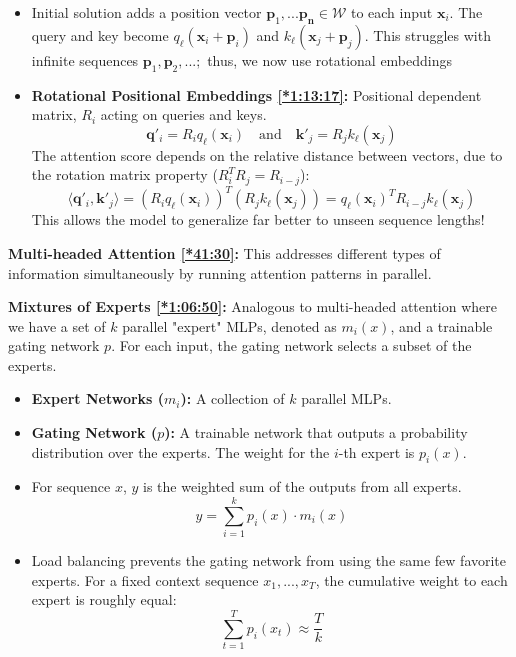 \documentclass[12pt, twoside]{article}
\theoremstyle{spaceddefn}
\begin{document}
\begin{itemize}
    \item Initial solution adds a position vector $\mathbf{p}_1,...\mathbf{p_n} \in \mathcal{W}$ to each input $\mathbf{x}_i$. The query and key become $q_\ell(\mathbf{x}_i + \mathbf{p}_i)$ and $k_\ell(\mathbf{x}_j + \mathbf{p}_j)$. This struggles with infinite sequences $\textbf{p}_1,\textbf{p}_2,...;$ thus, we now use rotational embeddings
    \item \textbf{Rotational Positional Embeddings \href{https://youtu.be/1u6h3Nm3NvM?si=uJFx5andJnolQajy&t=4397}{[*1:13:17]}:} Positional dependent matrix, $R_i$ acting on queries and keys.
\[
\mathbf{q}'_i = R_i q_\ell(\mathbf{x}_i) \quad \text{and} \quad \mathbf{k}'_j = R_j k_\ell(\mathbf{x}_j)
\]
The attention score depends on the relative distance between vectors, due to the rotation matrix property ($R_i^T R_j = R_{i-j}$):
\[
\langle \mathbf{q}'_i, \mathbf{k}'_j \rangle = (R_i q_\ell(\mathbf{x}_i))^T (R_j k_\ell(\mathbf{x}_j)) = q_\ell(\mathbf{x}_i)^T R_{i-j} k_\ell(\mathbf{x}_j)
\]
This allows the model to generalize far better to unseen sequence lengths!

\end{itemize}



\textbf{Multi-headed Attention \href{https://youtu.be/1u6h3Nm3NvM?si=8XEsgSeUe-450EJZ&t=2490}{[*41:30]}:} This addresses different types of information simultaneously by running attention patterns in parallel.

\textbf{Mixtures of Experts \href{https://youtu.be/1u6h3Nm3NvM?si=n3l9F7Tf5RbvhOU4&t=4010}{[*1:06:50]}:} Analogous to multi-headed attention where we have a set of $k$ parallel "expert" MLPs, denoted as $m_i(x)$, and a trainable gating network $p$. For each input, the gating network selects a subset of the experts.

\begin{itemize}
    \item \textbf{Expert Networks ($m_i$):} A collection of $k$ parallel MLPs.
    \item \textbf{Gating Network ($p$):} A trainable network that outputs a probability distribution over the experts. The weight for the $i$-th expert is $p_i(x)$.
    \item For sequence $x$, $y$ is the weighted sum of the outputs from all experts.
$$ y = \sum_{i=1}^{k} p_i(x) \cdot m_i(x)$$
    \item Load balancing prevents the gating network from  using the same few favorite experts. For a fixed context sequence $x_1,...,x_T$, the cumulative weight to each expert is roughly equal:
$$ \sum_{t=1}^{T} p_i(x_t) \approx \frac{T}{k} $$
\end{itemize}
\end{document}
